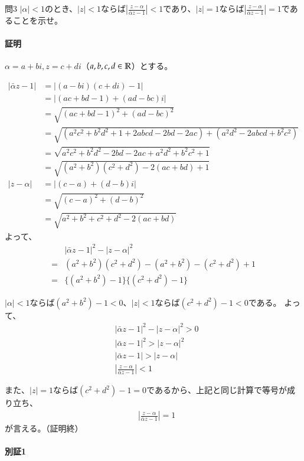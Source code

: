 \begin{mysimplebox}{問3}
    $|\alpha|<1$のとき、$|z|<1$ならば$\left|\frac{z-\alpha}{\bar{\alpha}z-1}\right|<1$であり、$|z|=1$ならば$\left|\frac{z-\alpha}{\bar{\alpha}z-1}\right|=1$であることを示せ。
\end{mysimplebox}
\paragraph{証明}
$\alpha=a+bi, z=c+di$（$a,b,c,d\in\mathbb{R}$）とする。

\begin{align*}
    |\bar{\alpha}z-1|&=|(a-bi)(c+di)-1|\\
    &=|(ac+bd-1)+(ad-bc)i|\\
    &=\sqrt{(ac+bd-1)^2+(ad-bc)^2}\\
    &=\sqrt{(a^2c^2+b^2d^2+1+2abcd-2bd-2ac)+(a^2d^2-2abcd+b^2c^2)}\\
    &=\sqrt{a^2c^2+b^2d^2-2bd-2ac+a^2d^2+b^2c^2+1}\\
    &=\sqrt{(a^2+b^2)(c^2+d^2)-2(ac+bd)+1}\\
    |z-\alpha|&=|(c-a)+(d-b)i|\\
    &=\sqrt{(c-a)^2+(d-b)^2}\\
    &=\sqrt{a^2+b^2+c^2+d^2-2(ac+bd)}
\end{align*}
よって、
\begin{align*}
    &|\bar{\alpha}z-1|^2-|z-\alpha|^2\\
    =&(a^2+b^2)(c^2+d^2)-(a^2+b^2)-(c^2+d^2)+1\\
    =&\{(a^2+b^2)-1\}\{(c^2+d^2)-1\}
\end{align*}

$|\alpha|<1$ならば$(a^2+b^2)-1<0$、$|z|<1$ならば$(c^2+d^2)-1<0$である。
よって、
\begin{align*}
    &|\bar{\alpha}z-1|^2-|z-\alpha|^2>0\\
    &|\bar{\alpha}z-1|^2>|z-\alpha|^2\\
    &|\bar{\alpha}z-1|>|z-\alpha|\\
    &\left|\frac{z-\alpha}{\bar{\alpha}z-1}\right|<1
\end{align*}

また、$|z|=1$ならば$(c^2+d^2)-1=0$であるから、上記と同じ計算で等号が成り立ち、
\begin{align*}
    &\left|\frac{z-\alpha}{\bar{\alpha}z-1}\right|=1
\end{align*}
が言える。（証明終）

\paragraph{別証1}

